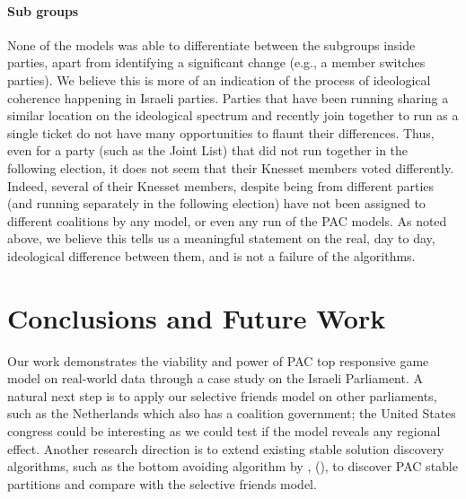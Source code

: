 \documentclass[letterpaper]{article} %
\newcommand{\citename}[1]{\citeauthor{#1}, (\citeyear{#1})}
\theoremstyle{definition}
\begin{document}
\paragraph{Sub groups}
None of the models was able to differentiate between the subgroups inside parties, apart from identifying a significant change (e.g., a member switches parties). We believe this is more of an indication of the process of ideological coherence happening in Israeli parties. Parties that have been running sharing a similar location on the ideological spectrum and recently join together to run as a single ticket do not have many opportunities to flaunt their differences. Thus, even for a party (such as the Joint List) that did not run together in the following election, it does not seem that their Knesset members voted differently. Indeed, several of their Knesset members, despite being from different parties (and running separately in the following election) have not been assigned to different coalitions by any model, or even any run of the PAC models. As noted above, we believe this tells us a meaningful statement on the real, day to day, ideological difference between them, and is not a failure of the algorithms.

\section{Conclusions and Future Work} \label{sec:conclusion}
Our work demonstrates the viability and power of PAC top responsive game model on real-world data through a case study on the Israeli Parliament. A natural next step is to apply our selective friends model on other parliaments, such as the Netherlands which also has a coalition government; the United States congress could be interesting as we could test if the model reveals any regional effect. Another research direction is to extend existing stable solution discovery algorithms, such as the bottom avoiding algorithm by \citename{SuSu10}, to discover PAC stable partitions and compare with the selective friends model.



\end{document}
